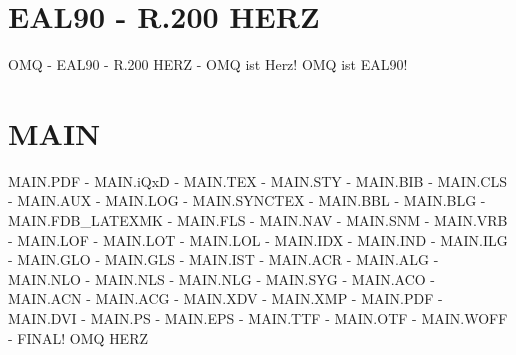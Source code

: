 \documentclass{MAIN}
\begin{document}
\maketitle
\section*{EAL90 - R.200 HERZ}
OMQ - EAL90 - R.200 HERZ - OMQ ist Herz! OMQ ist EAL90!
\section*{MAIN}
MAIN.PDF - MAIN.iQxD - MAIN.TEX - MAIN.STY - MAIN.BIB - MAIN.CLS - MAIN.AUX - MAIN.LOG - MAIN.SYNCTEX - MAIN.BBL - MAIN.BLG - MAIN.FDB_LATEXMK - MAIN.FLS - MAIN.NAV - MAIN.SNM - MAIN.VRB - MAIN.LOF - MAIN.LOT - MAIN.LOL - MAIN.IDX - MAIN.IND - MAIN.ILG - MAIN.GLO - MAIN.GLS - MAIN.IST - MAIN.ACR - MAIN.ALG - MAIN.NLO - MAIN.NLS - MAIN.NLG - MAIN.SYG - MAIN.ACO - MAIN.ACN - MAIN.ACG - MAIN.XDV - MAIN.XMP - MAIN.PDF - MAIN.DVI - MAIN.PS - MAIN.EPS - MAIN.TTF - MAIN.OTF - MAIN.WOFF - FINAL!
\cite{omq_eal90}
\ac{OMQ}
\ac{HERZ}

\printindex
\printglossary
\printnomenclature
\printacronyms
\end{document}
